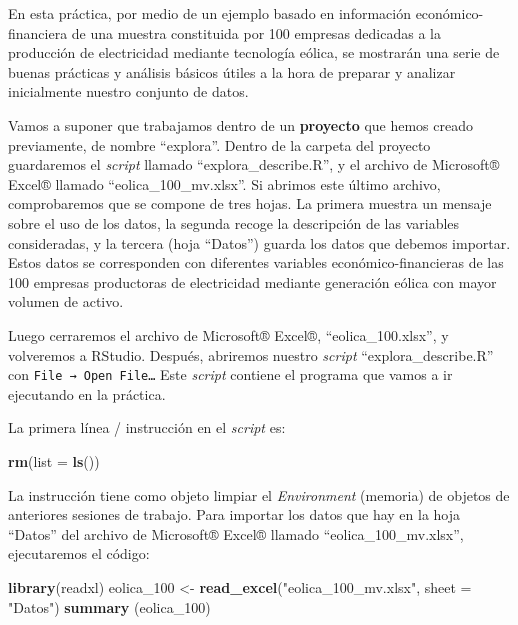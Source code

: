 \documentclass[
]{book}
\newenvironment{Shaded}{\begin{snugshade}}{\end{snugshade}}
\newcommand{\AttributeTok}[1]{\textcolor[rgb]{0.13,0.29,0.53}{#1}}
\newcommand{\FunctionTok}[1]{\textcolor[rgb]{0.13,0.29,0.53}{\textbf{#1}}}
\newcommand{\NormalTok}[1]{#1}
\newcommand{\OtherTok}[1]{\textcolor[rgb]{0.56,0.35,0.01}{#1}}
\newcommand{\StringTok}[1]{\textcolor[rgb]{0.31,0.60,0.02}{#1}}
\begin{document}
En esta práctica, por medio de un ejemplo basado en información económico-financiera de una muestra constituida por 100 empresas dedicadas a la producción de electricidad mediante tecnología eólica, se mostrarán una serie de buenas prácticas y análisis básicos útiles a la hora de preparar y analizar inicialmente nuestro conjunto de datos.

Vamos a suponer que trabajamos dentro de un \textbf{proyecto} que hemos creado previamente, de nombre ``explora''. Dentro de la carpeta del proyecto guardaremos el \emph{script} llamado ``explora\_describe.R'', y el archivo de Microsoft® Excel® llamado ``eolica\_100\_mv.xlsx''. Si abrimos este último archivo, comprobaremos que se compone de tres hojas. La primera muestra un mensaje sobre el uso de los datos, la segunda recoge la descripción de las variables consideradas, y la tercera (hoja ``Datos'') guarda los datos que debemos importar. Estos datos se corresponden con diferentes variables económico-financieras de las 100 empresas productoras de electricidad mediante generación eólica con mayor volumen de activo.

Luego cerraremos el archivo de Microsoft® Excel®, ``eolica\_100.xlsx'', y volveremos a RStudio. Después, abriremos nuestro \emph{script} ``explora\_describe.R'' con \texttt{File\ →\ Open\ File…} Este \emph{script} contiene el programa que vamos a ir ejecutando en la práctica.

La primera línea / instrucción en el \emph{script} es:

\begin{Shaded}
\begin{Highlighting}[]
\FunctionTok{rm}\NormalTok{(}\AttributeTok{list =} \FunctionTok{ls}\NormalTok{())}
\end{Highlighting}
\end{Shaded}

La instrucción tiene como objeto limpiar el \emph{Environment} (memoria) de objetos de anteriores sesiones de trabajo. Para importar los datos que hay en la hoja ``Datos'' del archivo de Microsoft® Excel® llamado ``eolica\_100\_mv.xlsx'', ejecutaremos el código:

\begin{Shaded}
\begin{Highlighting}[]
\FunctionTok{library}\NormalTok{(readxl)}
\NormalTok{eolica\_100 }\OtherTok{\textless{}{-}} \FunctionTok{read\_excel}\NormalTok{(}\StringTok{"eolica\_100\_mv.xlsx"}\NormalTok{, }\AttributeTok{sheet =} \StringTok{"Datos"}\NormalTok{)}
\FunctionTok{summary}\NormalTok{ (eolica\_100)}
\end{Highlighting}
\end{Shaded}
\end{document}
